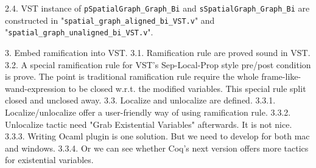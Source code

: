 2.4. VST instance of \texttt{pSpatialGraph\_Graph\_Bi} and \texttt{sSpatialGraph\_Graph\_Bi} are constructed in "\texttt{spatial\_graph\_aligned\_bi\_VST.v}" and "\texttt{spatial\_graph\_unaligned\_bi\_VST.v}".

3. Embed ramification into VST.
3.1. Ramification rule are proved sound in VST.
3.2. A special ramification rule for VST's Sep-Local-Prop style pre/post condition is prove. The point is traditional ramification rule require the whole frame-like-wand-expression to be closed w.r.t. the modified variables. This special rule split closed and unclosed away.
3.3. Localize and unlocalize are defined.
3.3.1. Localize/unlocalize offer a user-friendly way of using ramification rule.
3.3.2. Unlocalize tactic need "Grab Existential Variables" afterwards. It is not nice.
3.3.3. Writing Ocaml plugin is one solution. But we need to develop for both mac and windows.
3.3.4. Or we can see whether Coq's next version offers more tactics for existential variables.
